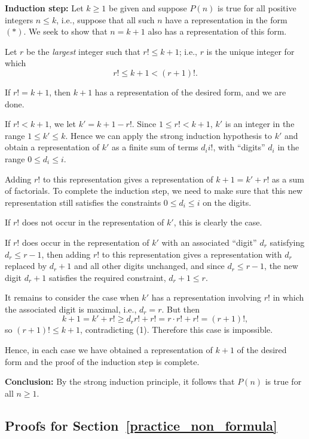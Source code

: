 \textbf{Induction step:} 
Let $k\ge1$ be given and suppose $P(n)$ is true for all positive
integers $ n\le k$, i.e., suppose that all such $n$ have a
representation in the form $(*)$. We seek to show that $n=k+1$ also has a
representation of this form. 

Let $r$ be the \emph{largest} integer such that $r!\le k+1$; i.e., $r$ is the
unique integer for which  
\[
r!\le k+1 < (r+1)!.
\tag{1}
\]

If $r!=k+1$, then $k+1$ has a representation of the desired form,
and we are done.

If $r!<k+1$, we let $k'=k+1-r!$.  Since $1\le r!<k+1$, 
$k'$ is an integer in the range $1\le k'\le k$. 
Hence we can apply the strong induction hypothesis to $k'$ and obtain a
representation of $k'$ as a finite sum of terms $d_ii!$, with ``digits'' 
$d_i$ in the range $0\le d_i\le i$.  

Adding $r!$ to this representation gives a representation of $k+1=k'+r!$
as a sum of factorials.  To complete the induction step, we need to make sure
that this new representation still satisfies the constraints $0\le d_i\le i$ 
on the digits. 

If $r!$ does not occur in the representation of $k'$, this is clearly the case.

If $r!$ does occur in the representation of $k'$ with an associated
``digit'' $d_r$ satisfying $d_r\le r-1$, 
then adding $r!$ to this representation gives a
representation with $d_r$ replaced by $d_r+1$ and all other digits unchanged, 
and since $d_r\le r-1$, the new digit $d_r+1$ satisfies the required
constraint, $d_r+1\le r$.

It remains to consider the case when $k'$ has a representation involving $r!$
in which the associated digit is maximal, i.e., $d_r=r$. But then 
\[
k+1=k'+r!\ge d_rr!+r! =r\cdot r! + r!=(r+1)!,
\]
so $(r+1)!\le k+1$, contradicting (1). Therefore this case is impossible. 

Hence, in each case we have obtained a representation of $k+1$ of the 
desired form and the proof of the 
induction step is complete.

\textbf{Conclusion:} By the strong induction principle, 
it follows that $P(n)$  is true for all $n\ge1$.

\subsection{Proofs for Section~\ref{practice_non_formula}}


